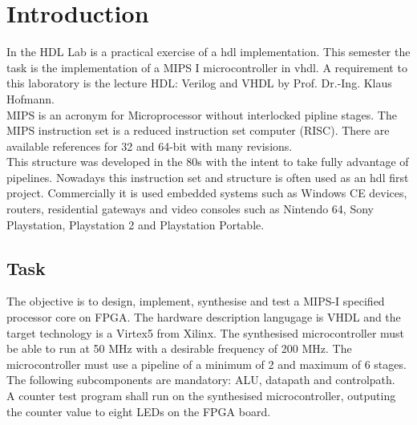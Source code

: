 \chapter{Introduction}
In the HDL Lab is a practical exercise of a hdl implementation. This semester the task is the implementation of a MIPS I microcontroller in vhdl. 
A requirement to this laboratory is the lecture HDL: Verilog and VHDL by Prof. Dr.-Ing. Klaus Hofmann.\\
MIPS is an acronym for Microprocessor without interlocked pipline stages.
The MIPS instruction set is a reduced instruction set computer (RISC). There are available references for 32 and 64-bit with many revisions.\\
This structure was developed in the 80s with the intent to take fully advantage of pipelines. Nowadays this instruction set and structure 
is often used as an hdl first project. Commercially it is used embedded systems such as Windows CE devices, routers, residential gateways and video
consoles such as Nintendo 64, Sony Playstation, Playstation 2 and Playstation Portable. \\

\section{Task}

The objective is to design, implement, synthesise and test a MIPS-I specified processor core on FPGA. 
The hardware description langugage is VHDL and the target technology is a Virtex5 from Xilinx.
The synthesised microcontroller must be able to run at 50 MHz with a desirable frequency of 200 MHz. 
The microcontroller must use a pipeline of a minimum of 2 and maximum of 6 stages.
The following subcomponents are mandatory: ALU, datapath and controlpath.\\
A counter test program shall run on the synthesised microcontroller, outputing the counter value
to eight LEDs on the FPGA board.
